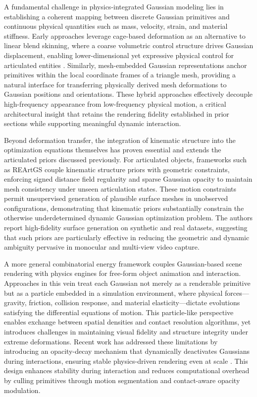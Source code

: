 \documentclass[11pt,a4paper]{article}
\begin{document}
A fundamental challenge in physics-integrated Gaussian modeling lies in establishing a coherent mapping between discrete Gaussian primitives and continuous physical quantities such as mass, velocity, strain, and material stiffness. Early approaches leverage cage-based deformation as an alternative to linear blend skinning, where a coarse volumetric control structure drives Gaussian displacement, enabling lower-dimensional yet expressive physical control for articulated entities \cite{arxiv:2311.08581v1}. Similarly, mesh-embedded Gaussian representations \cite{arxiv:2403.05087v1} anchor primitives within the local coordinate frames of a triangle mesh, providing a natural interface for transferring physically derived mesh deformations to Gaussian positions and orientations. These hybrid approaches effectively decouple high-frequency appearance from low-frequency physical motion, a critical architectural insight that retains the rendering fidelity established in prior sections while supporting meaningful dynamic interaction.

Beyond deformation transfer, the integration of kinematic structure into the optimization equations themselves has proven essential and extends the articulated priors discussed previously. For articulated objects, frameworks such as REArtGS \cite{arxiv:2503.06677v5} couple kinematic structure priors with geometric constraints, enforcing signed distance field regularity and sparse Gaussian opacity to maintain mesh consistency under unseen articulation states. These motion constraints permit unsupervised generation of plausible surface meshes in unobserved configurations, demonstrating that kinematic priors substantially constrain the otherwise underdetermined dynamic Gaussian optimization problem. The authors report high-fidelity surface generation on synthetic and real datasets, suggesting that such priors are particularly effective in reducing the geometric and dynamic ambiguity pervasive in monocular and multi-view video capture.

A more general combinatorial energy framework couples Gaussian-based scene rendering with physics engines for free-form object animation and interaction. Approaches in this vein treat each Gaussian not merely as a renderable primitive but as a particle embedded in a simulation environment, where physical forces---gravity, friction, collision response, and material elasticity---dictate evolutions satisfying the differential equations of motion. This particle-like perspective enables exchange between spatial densities and contact resolution algorithms, yet introduces challenges in maintaining visual fidelity and structure integrity under extreme deformations. Recent work has addressed these limitations by introducing an opacity-decay mechanism that dynamically deactivates Gaussians during interactions, ensuring stable physics-driven rendering even at scale \cite{arxiv:2511.09827v2}. This design enhances stability during interaction and reduces computational overhead by culling primitives through motion segmentation and contact-aware opacity modulation.
\end{document}
